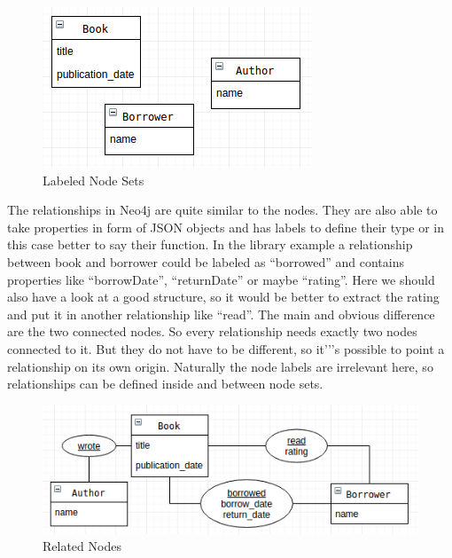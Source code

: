 \begin{figure}[H]
	\begin{center}
			\includegraphics[keepaspectratio]{images/neo4j/data-structure/labeled-nodes.png}
			\caption{Labeled Node Sets}
	\end{center}
\end{figure}

The relationships in Neo4j are quite similar to the nodes. They are also able to take properties in form of JSON objects and has labels to define their type or in this case better to say their function. In the library example a relationship between book and borrower could be labeled as “borrowed” and contains properties like “borrowDate”, “returnDate” or maybe “rating”. Here we should also have a look at a good structure, so it would be better to extract the rating and put it in another relationship like “read”.
The main and obvious difference are the two connected nodes. So every relationship needs exactly two nodes connected to it. But they do not have to be different, so it'’'s possible to point a relationship on its own origin. Naturally the node labels are irrelevant here, so relationships can be defined inside and between node sets.
\cite["Relationships", para. 1]{NeoTechnology2017c.2017c} \cite[p. 81-82]{Gupta.2015} \cite[slide 22-25]{Hunger.2013}

\begin{figure}[H]
	\includegraphics[width=\linewidth,keepaspectratio]{images/neo4j/data-structure/node-relationships.png}
	\caption{Related Nodes}
\end{figure}

